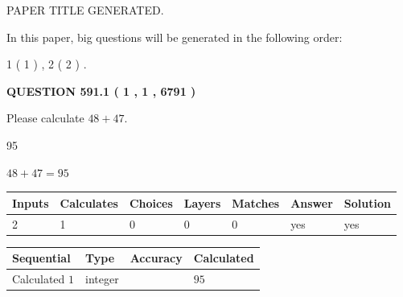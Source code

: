 \documentclass[12pt]{article}
\begin{document}
 
 
 
   
   
 PAPER TITLE GENERATED.
   
   
   
\vspace{0.2in}
   
In this paper, big questions will be generated in the following order: 
   
   
   1 ( 1 )
 ,
   2 ( 2 )
 .
  
\vspace{0.2in}
  
{\textbf{\Large{QUESTION
591.1 
 ( 1 , 1 , 6791 )
}}}
  
  
 
Please calculate $ %
48 +  %
47 $.
 
 
 
\noindent{}
 
 

95
 
 
\noindent{}
 
 

 
 
 
\noindent{}
 
 

$ %
48 +  %
47=   %
95$
 
 
\noindent{}
 
 

 
   
   
   
   
\noindent\begin{tabular}{|l|l|l|l|l|l|l|}
 \hline
Inputs & Calculates & Choices & Layers & Matches & Answer & Solution \\ \hline
 2  & 
 1  & 
 0
  & 
 0  & 
 0  & 
  yes & 
  yes 
  \\ \hline
 \end{tabular}
   
   
   
   
\noindent{}
   
   
  
  
\noindent\begin{tabular}{|l|l|l|l|}
\hline
 Sequential & Type & Accuracy & Calculated \\ 
\hline
 
 
  Calculated $  1 $ & integer &  & 
  $ 95 $ 
 \\  \hline  
 \end{tabular}
   
\end{document}
